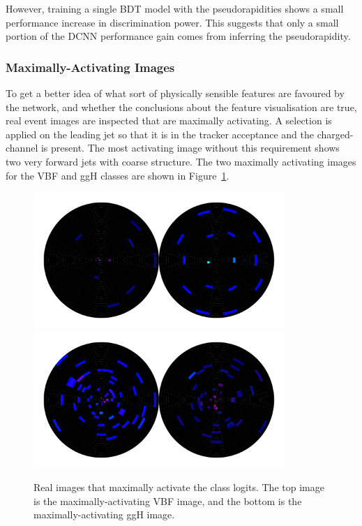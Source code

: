 However, training a single BDT model with the pseudorapidities shows a small performance increase in discrimination power. This suggests that only a small portion of the DCNN performance gain comes from inferring the pseudorapidity. 


\subsubsection{Maximally-Activating Images}
To get a better idea of what sort of physically sensible features are favoured by the network, and whether the conclusions about the feature visualisation are true, real event images are inspected that are maximally activating. 
A selection is applied on the leading jet so that it is in the tracker acceptance and the charged-\pt  channel is present. The most activating image without this requirement shows two very forward jets with coarse structure.  The two maximally activating images for the VBF and ggH classes are shown in Figure~\ref{fig:event_categorisation:maxact_vis_vbf_ggh}.
\begin{figure}[h!]
    \centering
    \includegraphics[width=0.85\textwidth]{figures/event_selection/max_img_vbf_tkr_cut_logits_normtype1.pdf}
    \includegraphics[width=0.85\textwidth]{figures/event_selection/max_img_ggh_tkr_cut_logits_normtype1.pdf}
    \caption{Real images that maximally activate the class logits. 
             The top image is the maximally-activating VBF image, and the bottom is the maximally-activating ggH image. }
    \label{fig:event_categorisation:maxact_vis_vbf_ggh}
\end{figure}

